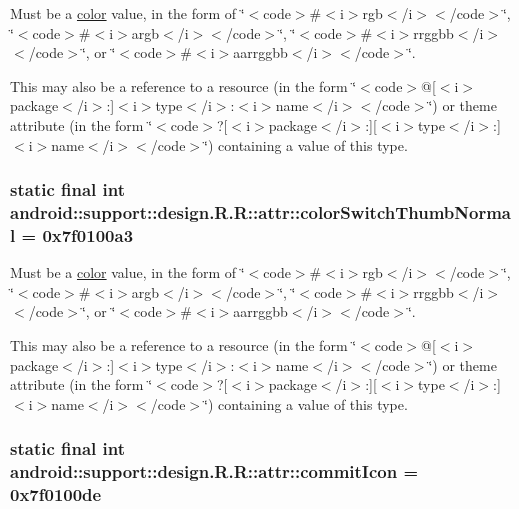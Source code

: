Must be a \hyperlink{classandroid_1_1support_1_1design_1_1_r_1_1color}{color} value, in the form of \char`\"{}$<$code$>$\#$<$i$>$rgb$<$/i$>$$<$/code$>$\char`\"{}, \char`\"{}$<$code$>$\#$<$i$>$argb$<$/i$>$$<$/code$>$\char`\"{}, \char`\"{}$<$code$>$\#$<$i$>$rrggbb$<$/i$>$$<$/code$>$\char`\"{}, or \char`\"{}$<$code$>$\#$<$i$>$aarrggbb$<$/i$>$$<$/code$>$\char`\"{}. 

This may also be a reference to a resource (in the form \char`\"{}$<$code$>$@\mbox{[}$<$i$>$package$<$/i$>$:\mbox{]}$<$i$>$type$<$/i$>$:$<$i$>$name$<$/i$>$$<$/code$>$\char`\"{}) or theme attribute (in the form \char`\"{}$<$code$>$?\mbox{[}$<$i$>$package$<$/i$>$:\mbox{]}\mbox{[}$<$i$>$type$<$/i$>$:\mbox{]}$<$i$>$name$<$/i$>$$<$/code$>$\char`\"{}) containing a value of this type. \hypertarget{classandroid_1_1support_1_1design_1_1_r_1_1attr_b15c194001f443fbfa7b3f7d347d3ec5}{
\subsubsection[{colorSwitchThumbNormal}]{\setlength{\rightskip}{0pt plus 5cm}static final int android::support::design.R.R::attr::colorSwitchThumbNormal = 0x7f0100a3}}
\label{classandroid_1_1support_1_1design_1_1_r_1_1attr_b15c194001f443fbfa7b3f7d347d3ec5}


Must be a \hyperlink{classandroid_1_1support_1_1design_1_1_r_1_1color}{color} value, in the form of \char`\"{}$<$code$>$\#$<$i$>$rgb$<$/i$>$$<$/code$>$\char`\"{}, \char`\"{}$<$code$>$\#$<$i$>$argb$<$/i$>$$<$/code$>$\char`\"{}, \char`\"{}$<$code$>$\#$<$i$>$rrggbb$<$/i$>$$<$/code$>$\char`\"{}, or \char`\"{}$<$code$>$\#$<$i$>$aarrggbb$<$/i$>$$<$/code$>$\char`\"{}. 

This may also be a reference to a resource (in the form \char`\"{}$<$code$>$@\mbox{[}$<$i$>$package$<$/i$>$:\mbox{]}$<$i$>$type$<$/i$>$:$<$i$>$name$<$/i$>$$<$/code$>$\char`\"{}) or theme attribute (in the form \char`\"{}$<$code$>$?\mbox{[}$<$i$>$package$<$/i$>$:\mbox{]}\mbox{[}$<$i$>$type$<$/i$>$:\mbox{]}$<$i$>$name$<$/i$>$$<$/code$>$\char`\"{}) containing a value of this type. \hypertarget{classandroid_1_1support_1_1design_1_1_r_1_1attr_70331187e69e5d459c342fb7377e0301}{
\subsubsection[{commitIcon}]{\setlength{\rightskip}{0pt plus 5cm}static final int android::support::design.R.R::attr::commitIcon = 0x7f0100de}}
\label{classandroid_1_1support_1_1design_1_1_r_1_1attr_70331187e69e5d459c342fb7377e0301}


